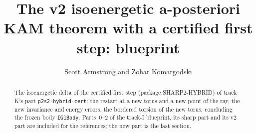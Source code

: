 \documentclass[11pt]{amsart}
\title{The v2 isoenergetic a-posteriori KAM theorem with a certified first step: blueprint}
\author{Scott Armstrong and Zohar Komargodski}
\begin{document}
\begin{abstract}
The isoenergetic delta of the certified first step (package SHARP2-HYBRID) of track K's part \texttt{p2s2-hybrid-cert}: the
restart at a new torus and a new point of the ray, the new invariance and energy errors, the bordered torsion of the new torus,
concluding the frozen body \texttt{IG1Body}. Parts~0--2 of the track-I blueprint, its sharp part and its v2 part are included for
the references; the new part is the last section.
\end{abstract}
\maketitle
\tableofcontents






\end{document}
